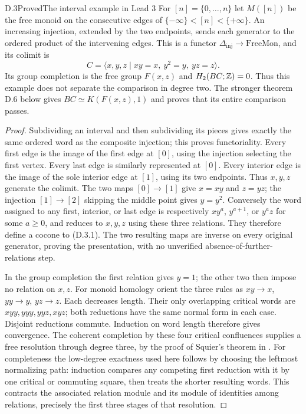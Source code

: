 \begin{claim}{D.3}{Proved}{The interval example in Lead 3}
\label{D:interval}
For $[n]=\{0,\ldots,n\}$ let $M([n])$ be the free monoid
on the consecutive edges of
$\{-\infty\}< [n] <\{+\infty\}$. An increasing injection,
extended by the two endpoints, sends each generator to the
ordered product of the intervening edges. This is a functor
$\Delta_{\mathrm{inj}}\to\mathrm{FreeMon}$, and its colimit is
\[
 C=\langle x,y,z\mid xy=x,\ y^2=y,\ yz=z\rangle.
 \tag{D.3.1}
\]
Its group completion is the free group $F(x,z)$ and
$H_2(BC;\mathbb Z)=0$. Thus this example does not separate the comparison
in degree two. The stronger theorem D.6 below gives
$BC\simeq K(F(x,z),1)$ and proves that its entire comparison passes.
\end{claim}
\begin{proof}
Subdividing an interval and then subdividing its pieces gives
exactly the same ordered word as the composite injection; this
proves functoriality. Every first edge is the image of the first
edge at $[0]$, using the injection selecting the first vertex.
Every last edge is similarly represented at $[0]$. Every interior
edge is the image of the sole interior edge at $[1]$, using its
two endpoints. Thus $x,y,z$ generate the colimit. The two maps
$[0]\to[1]$ give $x=xy$ and $z=yz$; the injection
$[1]\to[2]$ skipping the middle point gives $y=y^2$.
Conversely the word assigned to any first, interior, or last
edge is respectively $xy^a$, $y^{a+1}$, or $y^az$ for some
$a\geq0$, and reduces to $x,y,z$ using these three relations.
They therefore define a cocone to (D.3.1). The two resulting
maps are inverse on every original generator, proving the
presentation, with no unverified absence-of-further-relations step.

In the group completion the first relation gives $y=1$; the
other two then impose no relation on $x,z$.
For monoid homology orient the three rules as
$xy\to x$, $yy\to y$, $yz\to z$. Each decreases length.
Their only overlapping critical words are
$xyy,yyy,yyz,xyz$; both reductions have the same normal form
in each case. Disjoint reductions commute. Induction on word
length therefore gives convergence. The coherent completion
by these four critical confluences supplies a free resolution
through degree three, by the proof of Squier's theorem in
\cite[Theorem~7.3.5 and Proposition~9.3.2]{CDPolygraphs2025}.
For completeness the low-degree exactness used here follows
by choosing the leftmost normalizing path: induction compares
any competing first reduction with it by one critical or
commuting square, then treats the shorter resulting words.
This contracts the associated relation module and its module
of identities among relations, precisely the first three stages
of that resolution.


\end{proof}
